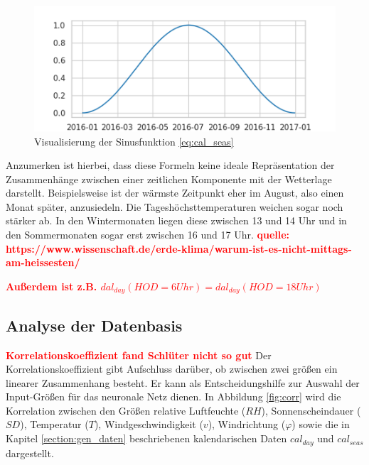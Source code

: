\documentclass[
12pt, %
toc=listofnumbered, %
toc=chapterentrydotfill, %
numbers=noenddot, %
captions=tableheading, %
bibliography=numbered
]{scrreprt}
\let\Oldsubsection\subsection
\renewcommand{\subsection}{\FloatBarrier\Oldsubsection}
\newcommand{\highlight}[1]{\textbf{\textcolor{red}{#1}}}
\begin{document}
\begin{itemize}
	\begin{figure}[tph]
		\begin{center}
			\includegraphics[]{./images/sinusdatum.png}
			\caption{Visualisierung der Sinusfunktion \ref{eq:cal_seas}}
			\label{fig:sinusjahr}
		\end{center}
	\end{figure}

\end{itemize}

Anzumerken ist hierbei, dass diese Formeln keine ideale Repräsentation der Zusammenhänge zwischen einer zeitlichen Komponente mit der Wetterlage darstellt. Beispielsweise ist der wärmste Zeitpunkt eher im August, also einen Monat später, anzusiedeln. Die Tageshöchsttemperaturen weichen sogar noch stärker ab. In den Wintermonaten liegen diese zwischen 13 und 14 Uhr und in den Sommermonaten sogar erst zwischen 16 und 17 Uhr.
\highlight{quelle: https://www.wissenschaft.de/erde-klima/warum-ist-es-nicht-mittags-am-heissesten/}

\highlight{Außerdem ist z.B. $dal_{day}(HOD=6Uhr) = dal_{day}(HOD=18Uhr)$}

\subsection{Analyse der Datenbasis}
\highlight{Korrelationskoeffizient fand Schlüter nicht so gut}
Der Korrelationskoeffizient gibt Aufschluss darüber, ob zwischen zwei größen ein linearer Zusammenhang besteht. Er kann als Entscheidungshilfe zur Auswahl der Input-Größen für das neuronale Netz dienen. In Abbildung \ref{fig:corr} wird die Korrelation zwischen den Größen relative Luftfeuchte ($RH$), Sonnenscheindauer ($SD$), Temperatur ($T$), Windgeschwindigkeit ($v$), Windrichtung ($\varphi$) sowie die in Kapitel \ref{section:gen_daten} beschriebenen kalendarischen Daten $cal_{day}$ und $cal_{seas}$ dargestellt. 
\end{document}
